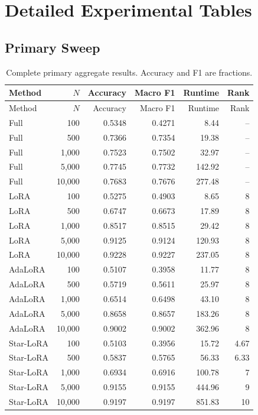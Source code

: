 \chapter{Detailed Experimental Tables}

\section{Primary Sweep}

\begin{longtable}{@{}lrrrrr@{}}
\caption{Complete primary aggregate results. Accuracy and F1 are fractions.}
\label{tab:complete-primary}\\
\toprule
Method & $N$ & Accuracy & Macro F1 & Runtime & Rank\\
\midrule
\endfirsthead
\toprule
Method & $N$ & Accuracy & Macro F1 & Runtime & Rank\\
\midrule
\endhead
Full & 100 & 0.5348 & 0.4271 & 8.44 & --\\
Full & 500 & 0.7366 & 0.7354 & 19.38 & --\\
Full & 1,000 & 0.7523 & 0.7502 & 32.97 & --\\
Full & 5,000 & 0.7745 & 0.7732 & 142.92 & --\\
Full & 10,000 & 0.7683 & 0.7676 & 277.48 & --\\
LoRA & 100 & 0.5275 & 0.4903 & 8.65 & 8\\
LoRA & 500 & 0.6747 & 0.6673 & 17.89 & 8\\
LoRA & 1,000 & 0.8517 & 0.8515 & 29.42 & 8\\
LoRA & 5,000 & 0.9125 & 0.9124 & 120.93 & 8\\
LoRA & 10,000 & 0.9228 & 0.9227 & 237.05 & 8\\
AdaLoRA & 100 & 0.5107 & 0.3958 & 11.77 & 8\\
AdaLoRA & 500 & 0.5719 & 0.5611 & 25.97 & 8\\
AdaLoRA & 1,000 & 0.6514 & 0.6498 & 43.10 & 8\\
AdaLoRA & 5,000 & 0.8658 & 0.8657 & 183.26 & 8\\
AdaLoRA & 10,000 & 0.9002 & 0.9002 & 362.96 & 8\\
Star-LoRA & 100 & 0.5103 & 0.3956 & 15.72 & 4.67\\
Star-LoRA & 500 & 0.5837 & 0.5765 & 56.33 & 6.33\\
Star-LoRA & 1,000 & 0.6934 & 0.6916 & 100.78 & 7\\
Star-LoRA & 5,000 & 0.9155 & 0.9155 & 444.96 & 9\\
Star-LoRA & 10,000 & 0.9197 & 0.9197 & 851.83 & 10\\
\bottomrule
\end{longtable}


